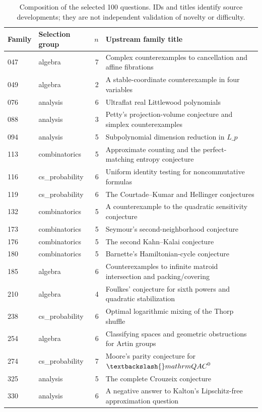 \documentclass[11pt]{article}
\begin{document}
\begin{table}[htbp]
\centering
\small
\caption{Composition of the selected 100 questions. IDs and titles identify source developments; they are not independent validation of novelty or difficulty.}\label{tab:families}
\begin{tabular}{llrp{8.2cm}}
\toprule
Family & Selection group & $n$ & Upstream family title \\
\midrule
047 & algebra & 7 & Complex counterexamples to cancellation and affine fibrations \\
049 & algebra & 2 & A stable-coordinate counterexample in four variables \\
076 & analysis & 6 & Ultraflat real Littlewood polynomials \\
088 & analysis & 3 & Petty's projection-volume conjecture and simplex counterexamples \\
094 & analysis & 5 & Subpolynomial dimension reduction in $L\_p$ \\
113 & combinatorics & 5 & Approximate counting and the perfect-matching entropy conjecture \\
116 & cs\_probability & 6 & Uniform identity testing for noncommutative formulas \\
119 & cs\_probability & 6 & The Courtade--Kumar and Hellinger conjectures \\
132 & combinatorics & 5 & A counterexample to the quadratic sensitivity conjecture \\
173 & combinatorics & 5 & Seymour's second-neighborhood conjecture \\
176 & combinatorics & 5 & The second Kahn--Kalai conjecture \\
180 & combinatorics & 5 & Barnette's Hamiltonian-cycle conjecture \\
185 & algebra & 6 & Counterexamples to infinite matroid intersection and packing/covering \\
210 & algebra & 4 & Foulkes' conjecture for sixth powers and quadratic stabilization \\
238 & cs\_probability & 6 & Optimal logarithmic mixing of the Thorp shuffle \\
254 & algebra & 6 & Classifying spaces and geometric obstructions for Artin groups \\
274 & cs\_probability & 7 & Moore's parity conjecture for $\textbackslash{}mathrm{QAC}^0$ \\
325 & analysis & 5 & The complete Crouzeix conjecture \\
330 & analysis & 6 & A negative answer to Kalton's Lipschitz-free approximation question \\
\bottomrule
\end{tabular}
\end{table}
\clearpage
\end{document}

